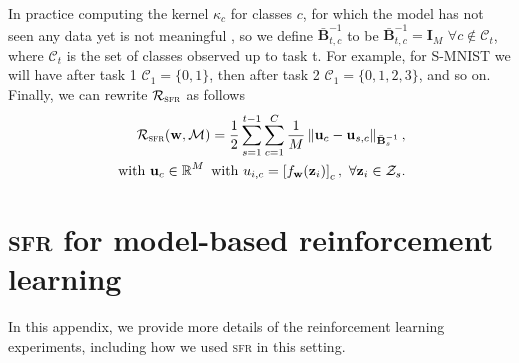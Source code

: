 \documentclass{article}
\newcommand{\our}{\textsc{sfr}\xspace}
\newcommand{\weights}{\ensuremath{\mathbf{w}}}
\newcommand{\mbf}[1]{\mathbf{#1}}
\newcommand{\MB}{\mbf{B}}
\newcommand{\MZ}{\mbf{Z}}
\newcommand{\MI}{\mbf{I}}
\newcommand{\vz}{\mbf{z}}
\newcommand{\vu}{\mbf{u}}
\begin{document}
In practice computing the kernel $\kappa_c$ for classes $c$, for which the model has not seen any data yet is not meaningful , so we define $\bar{\MB}^{-1}_{t, c}$ to be  $\bar{\MB}^{-1}_{t, c} = \MI_M$ $\forall c \not\in \mathcal{C}_t$, where $\mathcal{C}_t$ is the set of classes observed up to task t. For example, for S-MNIST  we will have after task 1 $\mathcal{C}_1 = \{0, 1\}$, then after task 2 $\mathcal{C}_1 = \{0, 1, 2, 3\}$, and so on. 
Finally, we can rewrite $\mathcal{R}_\mathrm{\our}$ as follows
\begin{equation}\label{eq-cl-regularizer}\textstyle
\begin{aligned}
  \mathcal{R}_\mathrm{\our}(\weights, \mathcal{M}) = \frac{1}{2} \sum_{s=1}^{t-1} \sum_{c=1}^{C} \frac{1}{M} 
	\left\lVert 
	\vu_c - \vu_{s,c} %
	\right\rVert_{\bar{\MB}^{-1}_{s}}, \\
	\text{~with~} \vu_c \in \R^M \text{~with~} u_{i, c} = \left[ f_{\weights}(\vz_{i}) \right]_c,~\forall {\vz_i} \in \mathcal{Z}_s .
\end{aligned}
\end{equation}




\section{\our for model-based reinforcement learning}
\label{app:rl}
In this appendix, we provide more details of the reinforcement learning experiments, including
how we used \our in this setting.
\end{document}
